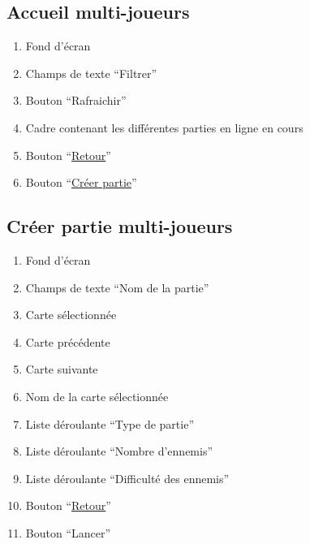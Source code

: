 \documentclass{report}
\begin{document}
		
\newpage

	\subsection{Accueil multi-joueurs}

		\hypertarget{Accueil multi-joueurs}{}
		\label{Accueil multi-joueurs}
	
		
		
		\begin{enumerate}
		  \item Fond d'écran
		  \item Champs de texte ``Filtrer''
		  \item Bouton ``Rafraichir''
		  \item Cadre contenant les différentes parties en ligne en cours
		  \item Bouton ``\hyperlink{Page d'accueil}{Retour}''
		  \item Bouton ``\hyperlink{Creer partie multi-joueurs}{Créer partie}''
		\end{enumerate}
	
\newpage

	\subsection{Créer partie multi-joueurs}
	
		\hypertarget{Creer partie multi-joueurs}{}
		\label{Creer partie multi-joueurs}
	
		
		
		\begin{enumerate}
		  \item Fond d'écran
		  \item Champs de texte ``Nom de la partie''
		  \item Carte sélectionnée
		  \item Carte précédente
		  \item Carte suivante
		  \item Nom de la carte sélectionnée
		  \item Liste déroulante ``Type de partie''
		  \item Liste déroulante ``Nombre d'ennemis''
		  \item Liste déroulante ``Difficulté des ennemis''
		  \item Bouton ``\hyperlink{Page d'accueil}{Retour}''
		  \item Bouton ``Lancer'' 
		\end{enumerate}
	
\end{document}
